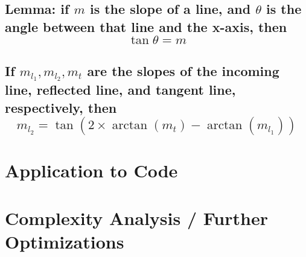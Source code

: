 \documentclass[11pt, oneside]{article}   	%
\begin{document}
\subsection{Lemma: if $m$ is the slope of a line, and $\theta$ is the angle between that line and the x-axis,
then $$\tan\theta = m$$}

\subsection{If $m_{l_1}, m_{l_2}, m_t$ are the slopes of the incoming line, reflected line, 
and tangent line, respectively, then $$m_{l_2} = \tan\left(2\times \arctan(m_t) - \arctan(m_{l_1})\right)$$}
\section{Application to Code}

\section{Complexity Analysis / Further Optimizations}
\end{document}
